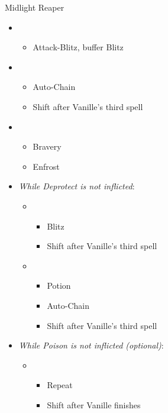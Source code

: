 	\vfill
	\begin{battle}[1:10]{Midlight Reaper}
		\begin{itemize}
			\item \first
			      \begin{itemize}
				      \item Attack-Blitz, buffer Blitz
			      \end{itemize}
			\item \fifth
			      \begin{itemize}
				      \item Auto-Chain
				      \item Shift after Vanille's third spell
			      \end{itemize}
			\item \third
			      \begin{itemize}
				      \item Bravery
				      \item Enfrost
			      \end{itemize}
			\item \textit{While Deprotect is not inflicted}:
			      \begin{itemize}
				      \item \sixth
				            \begin{itemize}
					            \item Blitz
					            \item Shift after Vanille's third spell
				            \end{itemize}
				      \item \fifth
				            \begin{itemize}
					            \item Potion
					            \item Auto-Chain
					            \item Shift after Vanille's third spell
				            \end{itemize}
			      \end{itemize}
			\item \textit{While Poison is not inflicted (optional)}:
			      \begin{itemize}
				      \item \first
				            \begin{itemize}
					            \item Repeat
					            \item Shift after Vanille finishes

\end{itemize}
\end{itemize}
\end{itemize}
\end{battle}
